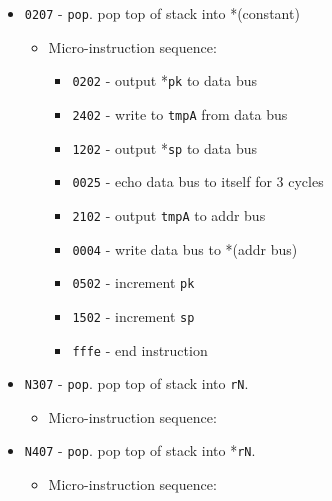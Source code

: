 \documentclass{article}
\def\pkptrout{\Verb|0202| - output *\Verb|pk| to data bus}
\def\spptodata{\Verb|1202| - output *\Verb|sp| to data bus}
\def\tmpatoaddr{\Verb|2102| - output \Verb|tmpA| to addr bus}
\def\datatotmpa{\Verb|2402| - write to \Verb|tmpA| from data bus}
\def\incrementpk{\Verb|0502| - increment \Verb|pk|}
\def\incrementsp{\Verb|1502| - increment \Verb|sp|}
\def\datatoreg#1{\Verb|#1403| - write to \Verb|r#1| from data bus}
\def\writeRAM{\Verb|0004| - write data bus to *(addr bus)}
\def\echodatalong{\Verb|0025| - echo data bus to itself for 3 cycles}
\def\done{\Verb|fffe| - end instruction}
\begin{document}
\begin{itemize}
    \item \Verb|0207| - \Verb|pop|. pop top of stack into *(constant)
    \begin{itemize}
        \item Micro-instruction sequence:
        \begin{itemize}
            \item\pkptrout
	        \item\datatotmpa
	        \item\spptodata
	        \item\echodatalong
	        \item\tmpatoaddr
	        \item\writeRAM
	        \item\incrementpk
            \item\incrementsp
	        \item\done
        \end{itemize}
    \end{itemize}
    
    \item \Verb|N307| - \Verb|pop|. pop top of stack into \Verb|rN|.
    \begin{itemize}
        \item Micro-instruction sequence:
    \end{itemize}
    
    \item \Verb|N407| - \Verb|pop|. pop top of stack into *\Verb|rN|.
    \begin{itemize}
        \item Micro-instruction sequence:
    \end{itemize}
\end{itemize}
\end{document}
